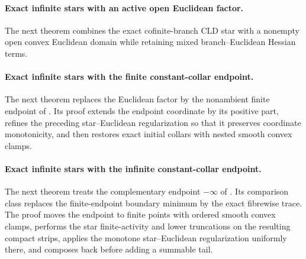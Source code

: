 \paragraph{Exact infinite stars with an active open Euclidean factor.}
The next theorem combines the exact cofinite-branch CLD star with a nonempty
open convex Euclidean domain while retaining mixed branch--Euclidean Hessian
terms.




\paragraph{Exact infinite stars with the finite constant-collar endpoint.}
The next theorem replaces the Euclidean factor by the nonambient finite
endpoint of .  Its proof extends
the endpoint coordinate by its positive part, refines the preceding
star--Euclidean regularization so that it preserves coordinate monotonicity,
and then restores exact initial collars with nested smooth convex clamps.




\paragraph{Exact infinite stars with the infinite constant-collar endpoint.}
The next theorem treats the complementary endpoint $-\infty$ of
.  Its comparison class replaces
the finite-endpoint boundary minimum by the exact fibrewise trace.  The
proof moves the endpoint to finite points with ordered smooth convex clamps,
performs the star finite-activity and lower truncations on the resulting
compact strips, applies the monotone star--Euclidean regularization
uniformly there, and composes back before adding a summable tail.





